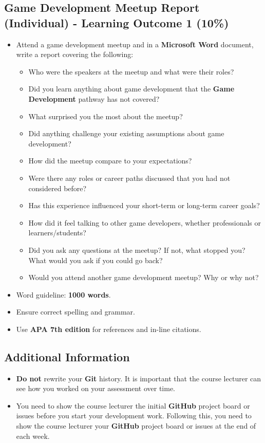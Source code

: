 \documentclass{article}
\begin{document}
\subsection*{Game Development Meetup Report (Individual) - Learning Outcome 1 (10\%)}
\begin{itemize}
	\item Attend a game development meetup and in a \textbf{Microsoft Word} document, write a report covering the following:
	\begin{itemize}
		\item Who were the speakers at the meetup and what were their roles?
		\item Did you learn anything about game development that the \textbf{Game Development} pathway has not covered?
		\item What surprised you the most about the meetup?
		\item Did anything challenge your existing assumptions about game development?
		\item How did the meetup compare to your expectations?
		\item Were there any roles or career paths discussed that you had not considered before?
		\item Has this experience influenced your short-term or long-term career goals?
		\item How did it feel talking to other game developers, whether professionals or learners/students?
		\item Did you ask any questions at the meetup? If not, what stopped you? What would you ask if you could go back?
		\item Would you attend another game development meetup? Why or why not?
	\end{itemize} 
	\item Word guideline: \textbf{1000 words}.
	\item Ensure correct spelling and grammar.
	\item Use \textbf{APA 7th edition} for references and in-line citations.
\end{itemize}

\subsection*{Additional Information}
\begin{itemize}
    \item \textbf{Do not} rewrite your \textbf{Git} history. It is important that the course lecturer can see how you worked on your assessment over time. 
    \item You need to show the course lecturer the initial \textbf{GitHub} project board or issues before you start your development work. Following this, you need to show the course lecturer your \textbf{GitHub} project board or issues at the end of each week.
\end{itemize} 
\end{document}
